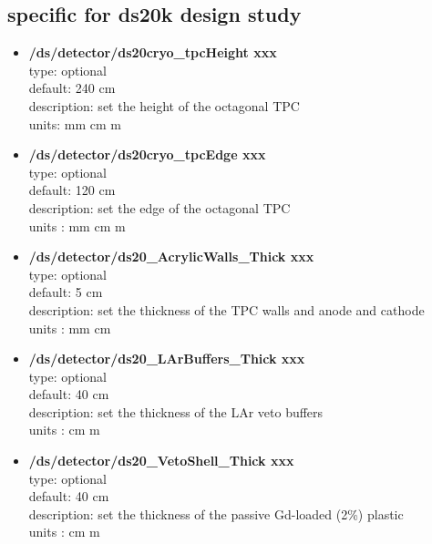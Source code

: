 \documentclass[twocolumn, 10pt]{article}
\begin{document}
\subsection{specific for ds20k design study}


\begin{itemize}
\item \textbf{/ds/detector/ds20cryo\_tpcHeight xxx}\\
type: optional \\
default:  240 cm\\
description: set the height of the octagonal TPC \\
units: mm cm m \\
\item \textbf{/ds/detector/ds20cryo\_tpcEdge xxx}\\
type: optional \\
default: 120 cm \\
description: set the edge of the octagonal TPC \\
units : mm cm m \\

\item \textbf{/ds/detector/ds20\_AcrylicWalls\_Thick xxx}\\
type: optional \\
default: 5 cm \\
description: set the thickness of the TPC walls and anode and cathode\\
units : mm cm \\

\item \textbf{/ds/detector/ds20\_LArBuffers\_Thick xxx}\\
type: optional \\
default: 40 cm \\
description: set the thickness of the LAr veto buffers\\
units : cm m\\

\item \textbf{/ds/detector/ds20\_VetoShell\_Thick xxx}\\
type: optional \\
default: 40 cm \\
description: set the thickness of the passive Gd-loaded (2\%) plastic \\ 
units : cm m\\


\end{itemize}
\end{document}
